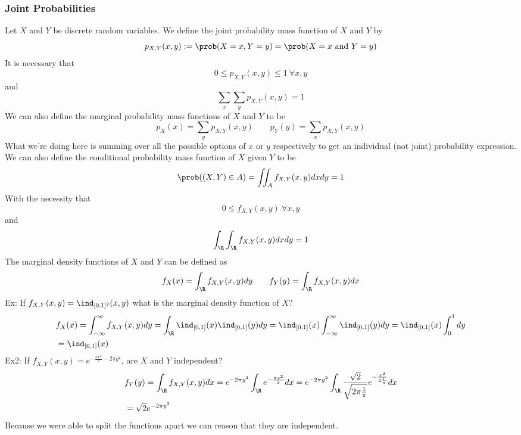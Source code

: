 \subsubsection{Joint Probabilities}
Let $X$ and $Y$ be discrete random variables. We define the joint probability mass function of $X$ and $Y$ by
\[p_{X,Y}(x,y):=\prob(X=x,Y=y)=\prob(X=x\text{ and }Y=y)\]
It is necessary that
\[0\leq p_{X,Y}(x,y)\leq 1\ \forall x,y\]
and
\[\sum_x\sum_y p_{X,Y}(x,y)=1\]
We can also define the marginal probability mass functions of $X$ and $Y$ to be
\[p_X(x)=\sum_y p_{X,Y}(x,y)\quad\quad p_Y(y)=\sum_x p_{X,Y}(x,y)\]
What we're doing here is summing over all the possible options of $x$ or $y$ respectively to get an individual (not joint) probability expression.\\
We can also define the conditional probability mass function of $X$ given $Y$ to be
\[\prob((X,Y)\in A)=\iint_A f_{X,Y}(x,y)dxdy=1\]
With the necessity that
\[0\leq f_{X,Y}(x,y)\ \forall x,y\]
and
\[\int_\R\int_\R f_{X,Y}(x,y)dxdy=1\]
The marginal density functions of $X$ and $Y$ can be defined as
\[f_X(x)=\int_\R f_{X,Y}(x,y)dy\quad\quad f_Y(y)=\int_\R f_{X,Y}(x,y)dx\]
Ex: If $f_{X,Y}(x,y)=\ind_{[0,1]^2}(x,y)$ what is the marginal density function of $X$?
\begin{align*}
    &f_X(x)=\int_{-\infty}^\infty f_{X,Y}(x,y)dy=\int_\R\ind_{[0,1]}(x)\ind_{[0,1]}(y)dy=\ind_{[0,1]}(x)\int_{-\infty}^\infty\ind_{[0,1]}(y)dy=\ind_{[0,1]}(x)\int_0^1 dy\\
    &=\ind_{[0,1]}(x)
\end{align*}
Ex2: If $f_{X,Y}(x,y)=e^{-\frac{\pi x^2}{2}-2\pi y^2}$, are $X$ and $Y$ independent?
\begin{align*}
    &f_Y(y)=\int_\R f_{X,Y}(x,y)dx=e^{-2\pi y^2}\int_\R e^{-\frac{\pi x^2}{2}}dx=e^{-2\pi y^2}\int_\R\frac{\sqrt{2}}{\sqrt{2\pi\frac{1}{\pi}}}e^{-\frac{x^2}{2\frac{1}{\pi}}}dx\\
    &=\sqrt{2}e^{-2\pi y^2}
\end{align*}
Because we were able to split the functions apart we can reason that they are independent.

